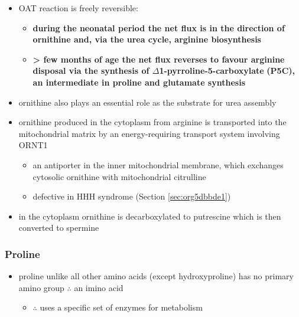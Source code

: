 \documentclass[12pt]{scrartcl}
\begin{document}
\begin{center}
\begin{center}
\begin{itemize}
\item OAT reaction is freely reversible:
\begin{itemize}
\item \textbf{during the neonatal period the net flux is in the direction of}
\textbf{ornithine and, via the urea cycle, arginine biosynthesis}
\item \textbf{\textgreater{} few months of age the net flux reverses to favour arginine}
\textbf{disposal via the synthesis of \(\Delta\)1-pyrroline-5-carboxylate}
\textbf{(P5C), an intermediate in proline and glutamate synthesis}
\end{itemize}
\item ornithine also plays an essential role as the substrate for urea assembly
\item ornithine produced in the cytoplasm from arginine is transported
into the mitochondrial matrix by an energy-requiring transport
system involving ORNT1
\begin{itemize}
\item an antiporter in the inner mitochondrial membrane, which exchanges
cytosolic ornithine with mitochondrial citrulline
\item defective in HHH syndrome (Section \ref{sec:org5dbbde1})
\end{itemize}
\item in the cytoplasm ornithine is decarboxylated to putrescine which is
then converted to spermine
\end{itemize}

\subsubsection{Proline}
\label{sec:orgd7ace53}
\begin{itemize}
\item proline unlike all other amino acids (except hydroxyproline) has
no primary amino group \(\therefore\) an imino acid
\begin{itemize}
\item \(\therefore\) uses a specific set of enzymes for metabolism
\end{itemize}
\end{itemize}

\begin{center}
\chemnameinit{}
\end{center}


\end{center}
\end{center}
\end{document}
